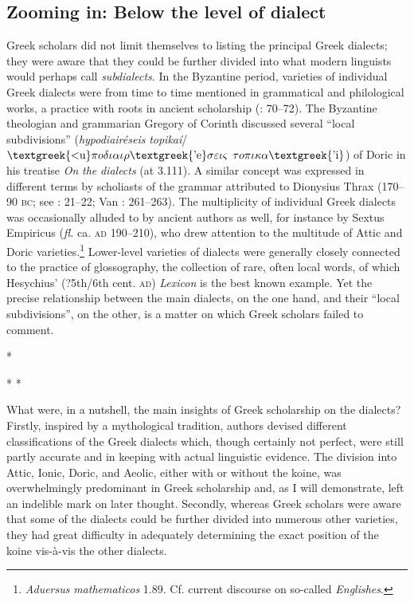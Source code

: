 \subsection{Zooming in: Below the level of dialect}
\hypertarget{Toc19704810}{}
Greek scholars did not limit themselves to listing the principal Greek dialects; they were aware that they could be further divided into what modern linguists would perhaps call \textit{subdialects}. In the Byzantine period, varieties of individual Greek dialects were from time to time mentioned in grammatical and philological works, a practice with roots in ancient scholarship (\citealt{Hainsworth1964}: 70–72). The Byzantine theologian and grammarian Gregory of Corinth discussed several “local subdivisions” (\textit{hypodiairéseis} \textit{topikaí}/$\text{\textgreek{<u}}\pi o\delta \iota \alpha \iota \rho \text{\textgreek{'e}}\sigma \varepsilon \iota \varsigma $ $\tau o\pi \iota \kappa \alpha \text{\textgreek{'i}}$) of Doric in his treatise \textit{On} \textit{the} \textit{dialects} (at 3.111). A similar concept was expressed in different terms by scholiasts of the grammar attributed to Dionysius Thrax (170–90 \textsc{bc}; see \citealt{Lambert2009}: 21–22; Van \citealt{Rooy2016d}: 261–263). The multiplicity of individual Greek dialects was occasionally alluded to by ancient authors as well, for instance by Sextus Empiricus (\textit{fl.} ca. \textsc{ad} 190–210), who drew attention to the multitude of Attic and Doric varieties.\footnote{\textit{Aduersus} \textit{mathematicos} 1.89. Cf. current discourse on so-called \textit{Englishes}.} Lower-level varieties of dialects were generally closely connected to the practice of glossography, the collection of rare, often local words, of which Hesychius’ (?5th/6th cent. \textsc{ad}) \textit{Lexicon} is the best known example. Yet the precise relationship between the main dialects, on the one hand, and their “local subdivisions”, on the other, is a matter on which Greek scholars failed to comment.

*

*  *

What were, in a nutshell, the main insights of Greek scholarship on the dialects? Firstly, inspired by a mythological tradition, authors devised different classifications of the Greek dialects which, though certainly not perfect, were still partly accurate and in keeping with actual linguistic evidence. The division into Attic, Ionic, Doric, and Aeolic, either with or without the koine, was overwhelmingly predominant in Greek scholarship and, as I will demonstrate, left an indelible mark on later thought. Secondly, whereas Greek scholars were aware that some of the dialects could be further divided into numerous other varieties, they had great difficulty in adequately determining the exact position of the koine vis-à-vis the other dialects.

